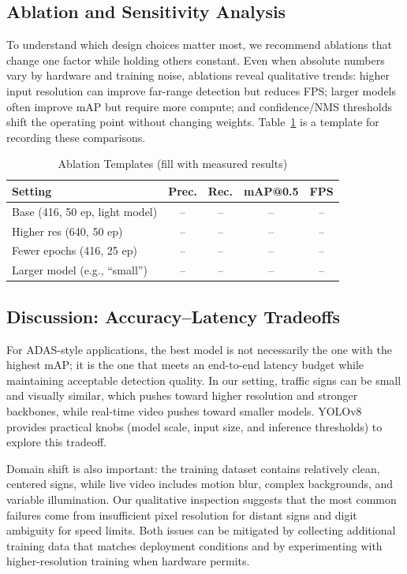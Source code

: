 \documentclass[conference]{IEEEtran}
\begin{document}
\subsection{Ablation and Sensitivity Analysis}
To understand which design choices matter most, we recommend ablations that change one factor while holding others constant. Even when absolute numbers vary by hardware and training noise, ablations reveal qualitative trends: higher input resolution can improve far-range detection but reduces FPS; larger models often improve mAP but require more compute; and confidence/NMS thresholds shift the operating point without changing weights. Table~\ref{tab:ablation} is a template for recording these comparisons.
\begin{table}[H]
\centering
\caption{Ablation Templates (fill with measured results)}
\label{tab:ablation}
\begin{tabular}{lcccc}
\toprule
\textbf{Setting} & \textbf{Prec.} & \textbf{Rec.} & \textbf{mAP@0.5} & \textbf{FPS} \\
\midrule
Base (416, 50 ep, light model) & -- & -- & -- & -- \\
Higher res (640, 50 ep) & -- & -- & -- & -- \\
Fewer epochs (416, 25 ep) & -- & -- & -- & -- \\
Larger model (e.g., ``small'') & -- & -- & -- & -- \\
\bottomrule
\end{tabular}
\end{table}

\subsection{Discussion: Accuracy--Latency Tradeoffs}
For ADAS-style applications, the best model is not necessarily the one with the highest mAP; it is the one that meets an end-to-end latency budget while maintaining acceptable detection quality. In our setting, traffic signs can be small and visually similar, which pushes toward higher resolution and stronger backbones, while real-time video pushes toward smaller models. YOLOv8 provides practical knobs (model scale, input size, and inference thresholds) to explore this tradeoff.

Domain shift is also important: the training dataset contains relatively clean, centered signs, while live video includes motion blur, complex backgrounds, and variable illumination. Our qualitative inspection suggests that the most common failures come from insufficient pixel resolution for distant signs and digit ambiguity for speed limits. Both issues can be mitigated by collecting additional training data that matches deployment conditions and by experimenting with higher-resolution training when hardware permits.
\end{document}
